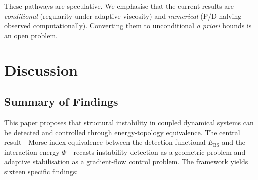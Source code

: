 \documentclass[final]{siamltex}
\newcommand{\Ebs}{E_{\mathrm{BS}}}
\begin{document}
These pathways are speculative. We emphasise that the current
results are \emph{conditional} (regularity under adaptive viscosity)
and \emph{numerical} (P/D halving observed computationally).
Converting them to unconditional \emph{a priori} bounds is an
open problem.


\section{Discussion}\label{sec:discussion}

\subsection{Summary of Findings}

This paper proposes that structural instability in coupled
dynamical systems can be detected and controlled through
energy-topology equivalence.  The central result---Morse-index
equivalence between the detection functional $\Ebs$ and the
interaction energy $\Phi$---recasts instability detection as a
geometric problem and adaptive stabilisation as a gradient-flow
control problem.  The framework yields sixteen specific findings:
\end{document}
